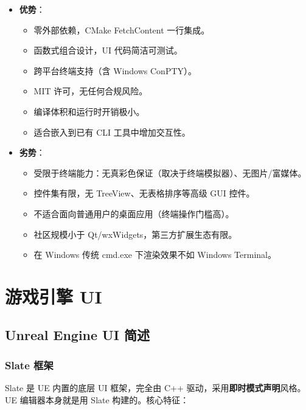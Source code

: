 \documentclass[12pt,a4paper,fontset=fandol]{ctexbook}
\begin{document}
\begin{compare}[title=FTXUI 优劣分析]
\begin{itemize}
  \item \textbf{优势}：
    \begin{itemize}
      \item 零外部依赖，CMake FetchContent 一行集成。
      \item 函数式组合设计，UI 代码简洁可测试。
      \item 跨平台终端支持（含 Windows ConPTY）。
      \item MIT 许可，无任何合规风险。
      \item 编译体积和运行时开销极小。
      \item 适合嵌入到已有 CLI 工具中增加交互性。
    \end{itemize}
  \item \textbf{劣势}：
    \begin{itemize}
      \item 受限于终端能力：无真彩色保证（取决于终端模拟器）、无图片/富媒体。
      \item 控件集有限，无 TreeView、无表格排序等高级 GUI 控件。
      \item 不适合面向普通用户的桌面应用（终端操作门槛高）。
      \item 社区规模小于 Qt/wxWidgets，第三方扩展生态有限。
      \item 在 Windows 传统 cmd.exe 下渲染效果不如 Windows Terminal。
    \end{itemize}
\end{itemize}
\end{compare}

\part{游戏引擎 UI}

\chapter{Unreal Engine UI 简述}

\section{Slate 框架}

Slate 是 UE 内置的底层 UI 框架，完全由 C++ 驱动，采用\textbf{即时模式声明}风格。
UE 编辑器本身就是用 Slate 构建的。核心特征：
\end{document}
